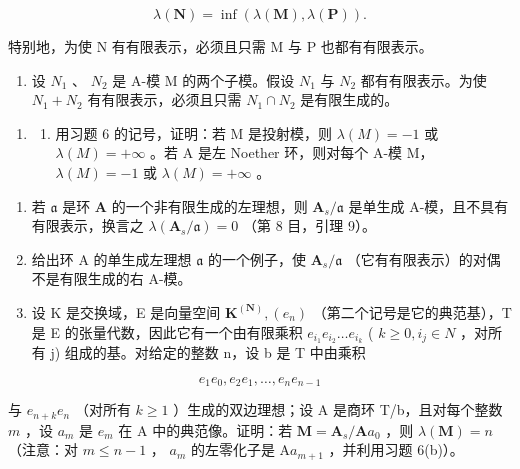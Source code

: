 \[
\lambda (\mathbf {N}) = \inf (\lambda (\mathbf {M}), \lambda (\mathbf {P})).
\]

特别地，为使 N 有有限表示，必须且只需 M 与 P 也都有有限表示。

\begin{enumerate}
\def\labelenumi{(\alph{enumi})}
\setcounter{enumi}{5}
\tightlist
\item
  设 \(N_{1}\) 、 \(N_{2}\) 是 A-模 M 的两个子模。假设 \(N_{1}\) 与 \(N_{2}\) 都有有限表示。为使 \(N_{1} + N_{2}\) 有有限表示，必须且只需 \(N_{1} \cap N_{2}\) 是有限生成的。
\end{enumerate}

\begin{enumerate}
\def\labelenumi{\arabic{enumi}.}
\setcounter{enumi}{6}
\tightlist
\item
  \begin{enumerate}
  \def\labelenumii{(\alph{enumii})}
  \tightlist
  \item
    用习题 6 的记号，证明：若 M 是投射模，则 \(\lambda(M) = -1\) 或 \(\lambda(M) = +\infty\) 。若 A 是左 Noether 环，则对每个 A-模 M， \(\lambda(M) = -1\) 或 \(\lambda(M) = +\infty\) 。
  \end{enumerate}
\end{enumerate}

\begin{enumerate}
\def\labelenumi{(\alph{enumi})}
\setcounter{enumi}{1}
\item
若 \(\mathfrak{a}\) 是环 \(\mathbf{A}\) 的一个非有限生成的左理想，则 \(\mathbf{A}_s / \mathfrak{a}\) 是单生成 A-模，且不具有有限表示，换言之 \(\lambda(\mathbf{A}_s / \mathfrak{a}) = 0\) （第 8 目，引理 9）。
\item
给出环 A 的单生成左理想 \(\mathfrak{a}\) 的一个例子，使 \(\mathbf{A}_s / \mathfrak{a}\) （它有有限表示）的对偶不是有限生成的右 A-模。
\item
设 K 是交换域，E 是向量空间 \(\mathbf{K}^{(\mathbf{N})}, (e_n)\) （第二个记号是它的典范基），T 是 E 的张量代数，因此它有一个由有限乘积 \(e_{i_1}e_{i_2}\ldots e_{i_k}\) ( \(k \geqslant 0, i_j \in N\) ，对所有 j) 组成的基。对给定的整数 n，设 b 是 T 中由乘积
\end{enumerate}

\[
e _ {1} e _ {0}, e _ {2} e _ {1}, \dots , e _ {n} e _ {n - 1}
\]

与 \(e_{n+k}e_n\) （对所有 \(k\geqslant 1\) ）生成的双边理想；设 A 是商环 T/b，且对每个整数 \(m\) ，设 \(a_m\) 是 \(e_m\) 在 A 中的典范像。证明：若 \(\mathbf{M} = \mathbf{A}_s / \mathbf{A}a_0\) ，则 \(\lambda (\mathbf{M}) = n\) （注意：对 \(m\leqslant n - 1\) ， \(a_m\) 的左零化子是 \(\mathrm{A}a_{m+1}\) ，并利用习题 6(b)）。

